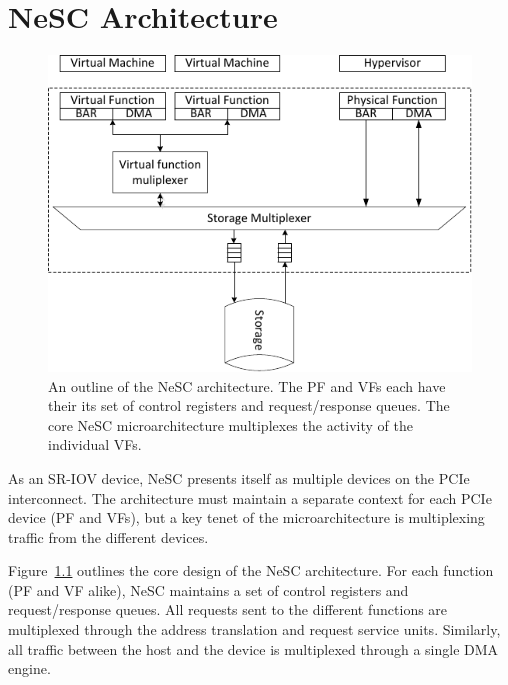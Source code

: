 \chapter{NeSC Architecture}
\label{chap:architecture}


\begin{figure}[t]
  \centering
  \includegraphics[width=1\columnwidth]{figs/architecture.pdf}
  \caption{An outline of the NeSC architecture. The PF and VFs each have their its set of control registers and request/response queues. The core NeSC microarchitecture multiplexes the activity of the individual VFs.}
  \label{fig:architecture}
\end{figure}



%

As an SR-IOV device, NeSC presents itself as multiple devices on the PCIe interconnect. The architecture must maintain a separate context for each PCIe device (PF and VFs), but a key tenet of the microarchitecture is multiplexing traffic from the different devices.

Figure~\ref{fig:architecture} outlines the core design of the NeSC architecture. For each function (PF and VF alike), NeSC maintains a set of  control registers and request/response queues. All requests sent to the different functions are multiplexed through the address translation and request service units. Similarly, all traffic between the host and the device is multiplexed through a single DMA engine. 

